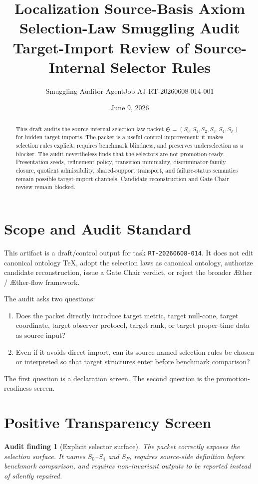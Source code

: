 \documentclass[11pt]{article}
\title{\textbf{Localization Source-Basis Axiom Selection-Law Smuggling Audit}\\[0.35em]
\large Target-Import Review of Source-Internal Selector Rules}
\author{Smuggling Auditor AgentJob AJ-RT-20260608-014-001}
\date{June 9, 2026}
\newcommand{\Aether}{\AE{}ther}
\newcommand{\Aflow}{\AE{}ther-flow}
\newcommand{\TheoryProgram}{\Aether{} / \Aflow{} framework}
\newcommand{\Sel}{\mathfrak{S}}
\newtheorem{auditfinding}{Audit finding}
\begin{document}
\maketitle

\begin{abstract}
This draft audits the source-internal selection-law packet
\(\Sel=(S_0,S_1,S_2,S_3,S_4,S_F)\) for hidden target imports. The packet is a
useful control improvement: it makes selection rules explicit, requires
benchmark blindness, and preserves underselection as a blocker. The audit
nevertheless finds that the selectors are not promotion-ready. Presentation
seeds, refinement policy, transition minimality, discriminator-family
closure, quotient admissibility, shared-support transport, and
failure-status semantics remain possible target-import channels. Candidate
reconstruction and Gate Chair review remain blocked.
\end{abstract}

\section{Scope and Audit Standard}

This artifact is a draft/control output for task \texttt{RT-20260608-014}. It
does not edit canonical ontology TeX, adopt the selection laws as canonical
ontology, authorize candidate reconstruction, issue a Gate Chair verdict, or
reject the broader \TheoryProgram{}.

The audit asks two questions:
\begin{enumerate}
    \item Does the packet directly introduce target metric, target null-cone,
    target coordinate, target observer protocol, target rank, or target
    proper-time data as source input?
    \item Even if it avoids direct import, can its source-named selection
    rules be chosen or interpreted so that target structures enter before
    benchmark comparison?
\end{enumerate}

The first question is a declaration screen. The second question is the
promotion-readiness screen.

\section{Positive Transparency Screen}

\begin{auditfinding}[Explicit selector surface]
The packet correctly exposes the selection surface. It names \(S_0\)--\(S_4\)
and \(S_F\), requires source-side definition before benchmark comparison, and
requires non-invariant outputs to be reported instead of silently repaired.
\end{auditfinding}
\end{document}
